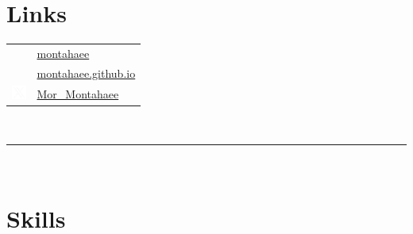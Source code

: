 \documentclass[onside]{article}
\begin{document}
{\begin{minipage}[t][\textheight-2\fboxsep-2\fboxrule][t]{\dimexpr0.40\textwidth-2\fboxrule-2\fboxsep\relax}
        \section*{\large Links}
        \begin{tabular}{cl}
            \faGithub{}   & \href{https://github.com/montahaee}{montahaee} \\
            \faGlobe{} & \href{https://montahaee.github.io/}{montahaee.github.io} \\
            \includegraphics[width=1.25em]{icon-twitterx-500.png} &  \href{https://x.com/Mor_Montahaee}{Mor\_Montahaee} \\
        \end{tabular}
        \vspace{10pt} \\
        \rule{\linewidth}{0.4pt} \\
        \section*{\large Skills}


\end{minipage}}
\end{document}
